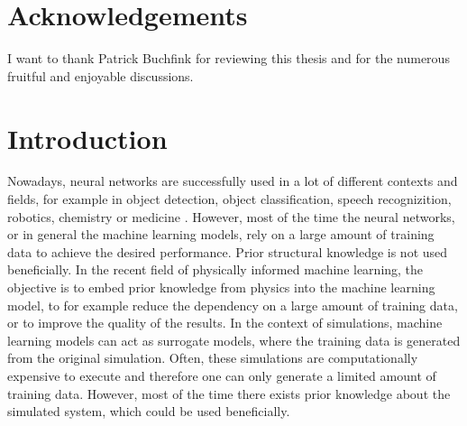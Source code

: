 \documentclass[twoside,a4paper]{article}
\begin{document}
\section*{Acknowledgements}
I want to thank Patrick Buchfink for reviewing this thesis and for the numerous
fruitful and enjoyable discussions.
\clearpage
\newpage\thispagestyle{plain}\null
\newpage\thispagestyle{plain}

%
%
\setcounter{tocdepth}{2}
\tableofcontents
\clearpage
\newpage\thispagestyle{plain}\null
%
%
\newpage
{} 
%
%
\section{Introduction}

Nowadays, neural networks are successfully used in a lot of different contexts and fields, 
for example in object detection, object classification, speech recognizition, robotics,
chemistry or medicine \cite{Goodfellow2016}.
However, most of the time the neural networks, or in general the machine learning models, 
rely on a large amount of training data to achieve the desired performance. Prior structural
knowledge is not used beneficially. In the recent field of physically informed machine
learning, the objective is to embed prior knowledge from physics into the machine 
learning model, to for example reduce the dependency on a large amount of training data, 
or to improve the quality of the results.
In the context of simulations, machine learning models can act as surrogate models,
where the training data is generated from the original simulation. Often, these 
simulations are computationally expensive to execute and therefore one can only 
generate a limited amount of training data. However, most of the time there exists 
prior knowledge about the simulated system, which could be used beneficially.
\end{document}
